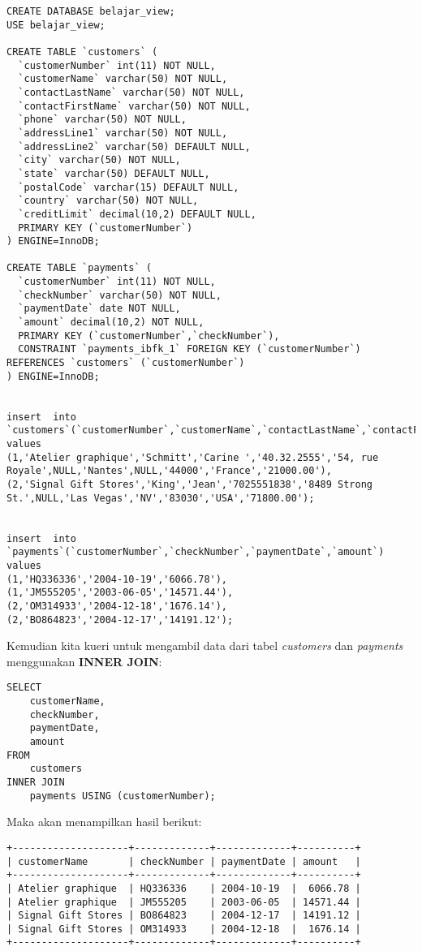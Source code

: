 \documentclass[a4paper]{article}
\begin{document}
\begin{lstlisting}
CREATE DATABASE belajar_view;
USE belajar_view;

CREATE TABLE `customers` (
  `customerNumber` int(11) NOT NULL,
  `customerName` varchar(50) NOT NULL,
  `contactLastName` varchar(50) NOT NULL,
  `contactFirstName` varchar(50) NOT NULL,
  `phone` varchar(50) NOT NULL,
  `addressLine1` varchar(50) NOT NULL,
  `addressLine2` varchar(50) DEFAULT NULL,
  `city` varchar(50) NOT NULL,
  `state` varchar(50) DEFAULT NULL,
  `postalCode` varchar(15) DEFAULT NULL,
  `country` varchar(50) NOT NULL,
  `creditLimit` decimal(10,2) DEFAULT NULL,
  PRIMARY KEY (`customerNumber`)
) ENGINE=InnoDB;

CREATE TABLE `payments` (
  `customerNumber` int(11) NOT NULL,
  `checkNumber` varchar(50) NOT NULL,
  `paymentDate` date NOT NULL,
  `amount` decimal(10,2) NOT NULL,
  PRIMARY KEY (`customerNumber`,`checkNumber`),
  CONSTRAINT `payments_ibfk_1` FOREIGN KEY (`customerNumber`) REFERENCES `customers` (`customerNumber`)
) ENGINE=InnoDB;


insert  into `customers`(`customerNumber`,`customerName`,`contactLastName`,`contactFirstName`,`phone`,`addressLine1`,`addressLine2`,`city`,`state`,`postalCode`,`country`,`creditLimit`) values 
(1,'Atelier graphique','Schmitt','Carine ','40.32.2555','54, rue Royale',NULL,'Nantes',NULL,'44000','France','21000.00'),
(2,'Signal Gift Stores','King','Jean','7025551838','8489 Strong St.',NULL,'Las Vegas','NV','83030','USA','71800.00');


insert  into `payments`(`customerNumber`,`checkNumber`,`paymentDate`,`amount`) values 
(1,'HQ336336','2004-10-19','6066.78'),
(1,'JM555205','2003-06-05','14571.44'),
(2,'OM314933','2004-12-18','1676.14'),
(2,'BO864823','2004-12-17','14191.12');
\end{lstlisting}

Kemudian kita kueri untuk mengambil data dari tabel \textit{customers} dan \textit{payments} menggunakan \textbf{INNER JOIN}:

\begin{lstlisting}
SELECT 
    customerName, 
    checkNumber, 
    paymentDate, 
    amount
FROM
    customers
INNER JOIN
    payments USING (customerNumber);
\end{lstlisting}

Maka akan menampilkan hasil berikut:
\begin{lstlisting}
+--------------------+-------------+-------------+----------+
| customerName       | checkNumber | paymentDate | amount   |
+--------------------+-------------+-------------+----------+
| Atelier graphique  | HQ336336    | 2004-10-19  |  6066.78 |
| Atelier graphique  | JM555205    | 2003-06-05  | 14571.44 |
| Signal Gift Stores | BO864823    | 2004-12-17  | 14191.12 |
| Signal Gift Stores | OM314933    | 2004-12-18  |  1676.14 |
+--------------------+-------------+-------------+----------+
\end{lstlisting}
\end{document}
